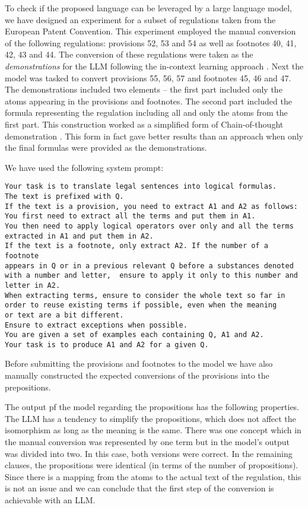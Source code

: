To check if the proposed language can be leveraged by a large language model, we have designed an experiment for a subset of regulations taken from the European Patent Convention.
This experiment employed the manual conversion of the following regulations: provisions 52, 53 and 54
 as well as footnotes 40, 41, 42, 43 and 44. The conversion of these regulations
 were taken as the \textit{demonstrations} for the LLM following the in-context learning approach \cite{dong2024surveyincontextlearning}.
 Next the model was tasked to 
 convert provisions 55, 56, 57 and footnotes 45, 46 and 47. The demonstrations 
 included two elements -- the first part included only the atoms appearing in the 
 provisions and footnotes. The second part included the formula representing the regulation including all and only
 the atoms from the first part. This construction worked as a simplified form of Chain-of-thought demonstration
 \cite{jason2022chain}.
This form in fact gave better results than an approach when only the final formulas were provided as
 the demonstrations.

 We have used the following system prompt:
\begin{verbatim}
Your task is to translate legal sentences into logical formulas.
The text is prefixed with Q.
If the text is a provision, you need to extract A1 and A2 as follows:
You first need to extract all the terms and put them in A1.
You then need to apply logical operators over only and all the terms 
extracted in A1 and put them in A2.
If the text is a footnote, only extract A2. If the number of a footnote
appears in Q or in a previous relevant Q before a substances denoted 
with a number and letter,  ensure to apply it only to this number and 
letter in A2.
When extracting terms, ensure to consider the whole text so far in 
order to reuse existing terms if possible, even when the meaning 
or text are a bit different.
Ensure to extract exceptions when possible.
You are given a set of examples each containing Q, A1 and A2. 
Your task is to produce A1 and A2 for a given Q.     
\end{verbatim}

Before submitting the provisions and footnotes to the model we have also manually
constructed the expected conversions of the provisions into the prepositions.

The output pf the model regarding the propositions has the following properties. The LLM
has a tendency to simplify the propositions, which does not affect the isomorphism as long as the meaning is the same. There was one concept which in the manual conversion was represented by one term but in the model's output was divided into two. In this case, both versions were correct. In the remaining clauses, the propositions were identical (in terms of the number of propositions). Since
 there is a mapping from the atoms to the actual text of the regulation, this is not an issue and
 we can conclude that the first step of the conversion is achievable with an LLM.

